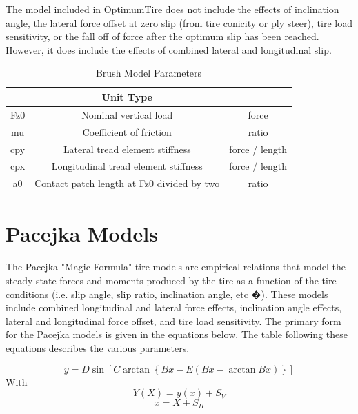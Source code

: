 The model included in OptimumTire does not include the effects of inclination angle, the lateral force offset at zero slip (from tire conicity or ply steer), tire load sensitivity, or the fall off of force after the optimum slip has been reached. However, it does include the effects of combined lateral and longitudinal slip. 

\begin{table}[H]
	\centering
			\begin{tabular}{|c|c|c|}
			\hline
			\rowcolor{tblue}\multicolumn{2}{|c|}{\cellcolor{tblue}\textbf{Brush Model Parameters}}&Unit Type \\ \hline
				Fz0	&Nominal vertical load	&force\\ \hline
				mu	&Coefficient of friction	&ratio\\ \hline
				cpy	&Lateral tread element stiffness	&force / length\\ \hline
				cpx	&Longitudinal tread element stiffness &	force / length\\ \hline
				a0	&Contact patch length at Fz0 divided by two&	ratio\\ \hline
			\end{tabular}
	\caption{Brush Model Parameters}
	\label{tbl:BrushModelParameters}
\end{table}

\section{Pacejka Models}
\label{sec:PacejkaModels}
The Pacejka "Magic Formula" tire models are empirical relations that model the steady-state forces and moments produced by the tire as a function of the tire conditions (i.e. slip angle, slip ratio, inclination angle, etc �). These models include combined longitudinal and lateral force effects, inclination angle effects, lateral and longitudinal force offset, and tire load sensitivity. The primary form for the Pacejka models is given in the equations below. The table following these equations describes the various parameters.

\begin{displaymath}
y=D\sin\left[C\arctan\left\{Bx-E\left(Bx-\arctan{Bx}\right)\right\}\right]
\end{displaymath}
With
\begin{displaymath}
Y(X)= y(x)+ S_V
\end{displaymath}
\begin{displaymath}
x=X+S_H
\end{displaymath}

